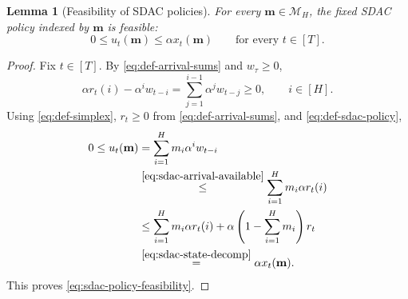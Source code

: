 \documentclass[journal]{IEEEtran}
\newtheorem{lemma}{Lemma}
\theoremstyle{remark}
\begin{document}
\begin{lemma}[Feasibility of SDAC policies]
\label{lem:sdac-feasibility}
For every $\mathbf{m}\in\mathcal{M}_H$, the fixed SDAC policy
indexed by $\mathbf{m}$ is feasible:
\begin{equation}
\label{eq:sdac-policy-feasibility}
0\le u_t(\mathbf{m})\le \alpha x_t(\mathbf{m})
\qquad \text{for every }t\in[T].
\end{equation}
\end{lemma}

\begin{proof}
Fix $t\in[T]$. By \eqref{eq:def-arrival-sums} and $w_\tau\ge0$,
\begin{equation}
\label{eq:sdac-arrival-available}
\alpha r_t(i)-\alpha^i w_{t-i}
=\sum_{j=1}^{i-1}\alpha^j w_{t-j}
\ge0,\qquad i\in[H].
\end{equation}
Using \eqref{eq:def-simplex}, $r_t\ge0$ from \eqref{eq:def-arrival-sums},
and \eqref{eq:def-sdac-policy},
\begin{align*}
0\le u_t(\mathbf{m})
&=\sum_{i=1}^H m_i\alpha^i w_{t-i} \\
&\overset{\eqref{eq:sdac-arrival-available}}{\le}
\sum_{i=1}^H m_i\alpha r_t(i) \\
&\le\sum_{i=1}^H m_i\alpha r_t(i)
+\alpha\left(1-\sum_{i=1}^H m_i\right)r_t \\
&\overset{\eqref{eq:sdac-state-decomp}}{=}\alpha x_t(\mathbf{m}).
\end{align*}
This proves \eqref{eq:sdac-policy-feasibility}.
\end{proof}
\end{document}
